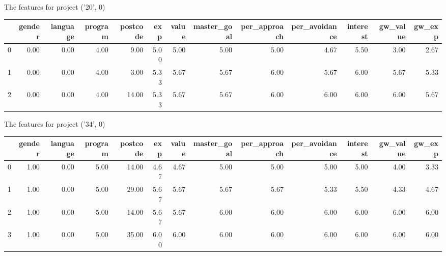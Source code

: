 \documentclass[7pt]{article}
\begin{document}
\begin{landscape}
The features for project ('20', 0)\newline
\begin{tabular}{lrrrrrrrrrrrr}
\toprule
{} &  gender &  language &  program &  postcode &  exp &  value &  master\_goal &  per\_approach &  per\_avoidance &  interest &  gw\_value &  gw\_exp \\
\midrule
0 &    0.00 &      0.00 &     4.00 &      9.00 & 5.00 &   5.00 &         5.00 &          5.00 &           4.67 &      5.50 &             3.00 &           2.67 \\
1 &    0.00 &      0.00 &     4.00 &      3.00 & 5.33 &   5.67 &         5.67 &          6.00 &           5.67 &      6.00 &             5.67 &           5.33 \\
2 &    0.00 &      0.00 &     4.00 &     14.00 & 5.33 &   5.67 &         5.67 &          6.00 &           6.00 &      6.00 &             6.00 &           5.67 \\
\bottomrule
\end{tabular}

The features for project ('34', 0)\newline
\begin{tabular}{lrrrrrrrrrrrr}
\toprule
{} &  gender &  language &  program &  postcode &  exp &  value &  master\_goal &  per\_approach &  per\_avoidance &  interest &  gw\_value &  gw\_exp \\
\midrule
0 &    1.00 &      0.00 &     5.00 &     14.00 & 4.67 &   4.67 &         5.00 &          5.00 &           5.00 &      5.00 &             4.00 &           3.33 \\
1 &    1.00 &      0.00 &     5.00 &     29.00 & 5.67 &   5.67 &         5.67 &          5.67 &           5.33 &      5.50 &             4.33 &           4.67 \\
2 &    1.00 &      0.00 &     5.00 &     14.00 & 5.67 &   5.67 &         6.00 &          6.00 &           6.00 &      6.00 &             6.00 &           6.00 \\
3 &    1.00 &      0.00 &     5.00 &     35.00 & 6.00 &   6.00 &         6.00 &          6.00 &           6.00 &      6.00 &             6.00 &           6.00 \\
\bottomrule
\end{tabular}


\end{landscape}
\end{document}
